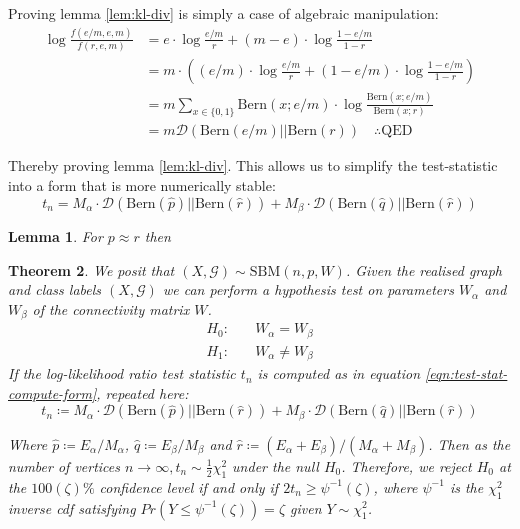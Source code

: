 \documentclass[]{article}
\newcommand{\Gcal}{\mathcal{G}}
\newcommand{\kl}{\mathcal{D}}
\newtheorem{theorem}{Theorem}[section]
\newtheorem{lemma}[theorem]{Lemma}
\begin{document}
Proving lemma \ref{lem:kl-div} is simply a case of algebraic manipulation:
%
\begin{align}
	\log \frac{f(e/m, e, m)}{f(r, e, m)} &= e \cdot \log \frac{e/m}{r} + (m-e) \cdot \log \frac{1- e/m}{1 - r} \nonumber \\
	&= m \cdot \left( (e/m) \cdot \log \frac{e/m}{r} + (1 - e/m) \cdot \log \frac{1- e/m}{1 - r} \right) \nonumber \\
	&= m \sum_{x \in \{0, 1\}} \textrm{Bern}(x; e/m) \cdot \log \frac{\textrm{Bern}(x; e/m)}{\textrm{Bern}(x; r)} \nonumber \\
	&= m \kl \left( \textrm{Bern}(e/m) || \textrm{Bern}(r) \right) \quad \therefore \textrm{QED}
\end{align}

Thereby proving lemma \ref{lem:kl-div}. This allows us to simplify the test-statistic into a form that is more numerically stable:
%
\begin{equation}
	t_n = M_\alpha \cdot \kl\left( \textrm{Bern}(\hat{p}) || \textrm{Bern}(\hat{r})\right) + 
	M_\beta \cdot \kl\left( \textrm{Bern}(\hat{q}) || \textrm{Bern}(\hat{r})\right)
	\label{eqn:test-stat-compute-form}
\end{equation}

\begin{lemma}
	For $p \approx r$ then 
\end{lemma}

\begin{theorem}
	We posit that $(X, \Gcal) \sim \textrm{SBM}(n, p, W)$. Given the realised graph and class labels $(X, \Gcal)$ we can perform a hypothesis test on parameters $W_\alpha$ and $W_\beta$ of the connectivity matrix $W$.
	\begin{align*}
	H_0:& \quad W_{\alpha} = W_{\beta} \\
	H_1:& \quad W_{\alpha} \neq W_{\beta}
	\end{align*}
	If the log-likelihood ratio test statistic $t_n$ is computed as in equation \ref{eqn:test-stat-compute-form}, repeated here:
	\begin{equation*}
		t_n \coloneqq  M_\alpha \cdot \kl\left( \textrm{Bern}(\hat{p}) || \textrm{Bern}(\hat{r})\right) + 
		M_\beta \cdot \kl\left( \textrm{Bern}(\hat{q}) || \textrm{Bern}(\hat{r})\right)
	\end{equation*}
	
	Where $\hat{p} \coloneqq E_\alpha / M_\alpha$, $\hat{q} \coloneqq E_\beta / M_\beta$ and $\hat{r} \coloneqq (E_\alpha + E_\beta) / (M_\alpha + M_\beta)$. Then as the number of vertices $n \rightarrow \infty, t_n \sim \frac{1}{2} \chi^2_1$ under the null $H_0$. Therefore, we reject $H_0$ at the $100(\zeta)\%$ confidence level if and only if $2t_n \geq \psi^{-1}(\zeta)$, where $\psi^{-1}$ is the $\chi^2_1$ inverse cdf satisfying $Pr(Y \leq \psi^{-1}(\zeta)) = \zeta$ given $Y \sim \chi^2_1$.
	
	\label{theorem:hyp-test-sbm-chi}
\end{theorem}
\end{document}
